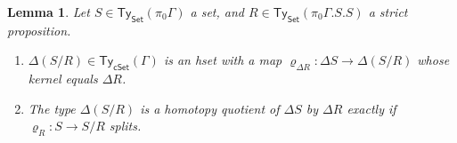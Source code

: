 \documentclass[10pt,a4paper]{article}
\newtheorem{lemma}{Lemma}[section]
\newcommand{\Set}{\mathsf{Set}}
\newcommand{\cSet}{\mathsf{cSet}}
\newcommand\Ty{\mathsf{Ty}}
\begin{document}
\begin{lemma}\label{prop:set-quotient-is-homotopy-quotient-iff-surjection-splits}
  Let \(S \in \Ty_{\Set}(\pi_0\Gamma)\) a set, and \(R \in \Ty_{\Set}(\pi_0\Gamma.S.S)\) a strict proposition.
  \begin{enumerate}[label=(\arabic*)]
    \item\label{prop:set-quotient-is-homotopy-quotient-iff-surjection-splits:well-defined}
      \(\Delta(S/R) \in \Ty_{\cSet}(\Gamma)\) is an hset with a map \(\varrho_{\Delta R} \colon \Delta S \to \Delta(S/R)\) whose kernel equals \(\Delta R\). 
    \item\label{prop:set-quotient-is-homotopy-quotient-iff-surjection-splits:characterization}
      The type \(\Delta(S/R)\) is a homotopy quotient of \(\Delta S\) by \(\Delta R\) exactly if \(\varrho_{R} \colon S \to S/R\) splits.
    \end{enumerate}  
\end{lemma}
\end{document}
